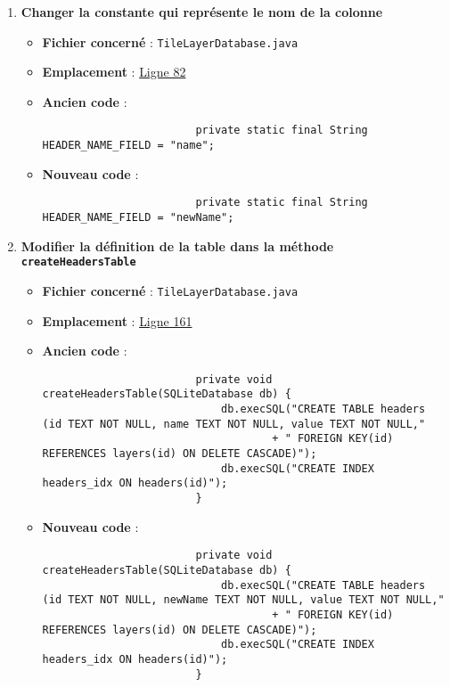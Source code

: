 \begin{enumerate}
    \item \textbf{Changer la constante qui représente le nom de la colonne}
          \begin{itemize}
              \item \textbf{Fichier concerné} : \texttt{TileLayerDatabase.java}
              \item \textbf{Emplacement} : \href{https://github.com/MarcusWolschon/osmeditor4android/blob/dcabe8084aa15f5551a37c990516bf73398af1bf/src/main/java/de/blau/android/resources/TileLayerDatabase.java#L82}{Ligne 82}
              \item \textbf{Ancien code} :
                    \begin{verbatim}
                        private static final String HEADER_NAME_FIELD = "name";
                    \end{verbatim}
              \item \textbf{Nouveau code} :
                    \begin{verbatim}
                        private static final String HEADER_NAME_FIELD = "newName";
                    \end{verbatim}
          \end{itemize}

    \item \textbf{Modifier la définition de la table dans la méthode \texttt{createHeadersTable}}
          \begin{itemize}
              \item \textbf{Fichier concerné} : \texttt{TileLayerDatabase.java}
              \item \textbf{Emplacement} : \href{https://github.com/MarcusWolschon/osmeditor4android/blob/dcabe8084aa15f5551a37c990516bf73398af1bf/src/main/java/de/blau/android/resources/TileLayerDatabase.java#L161}{Ligne 161}
              \item \textbf{Ancien code} :
                    \begin{verbatim}
                        private void createHeadersTable(SQLiteDatabase db) {
                            db.execSQL("CREATE TABLE headers (id TEXT NOT NULL, name TEXT NOT NULL, value TEXT NOT NULL,"
                                    + " FOREIGN KEY(id) REFERENCES layers(id) ON DELETE CASCADE)");
                            db.execSQL("CREATE INDEX headers_idx ON headers(id)");
                        }
                    \end{verbatim}
              \item \textbf{Nouveau code} :
                    \begin{verbatim}
                        private void createHeadersTable(SQLiteDatabase db) {
                            db.execSQL("CREATE TABLE headers (id TEXT NOT NULL, newName TEXT NOT NULL, value TEXT NOT NULL,"
                                    + " FOREIGN KEY(id) REFERENCES layers(id) ON DELETE CASCADE)");
                            db.execSQL("CREATE INDEX headers_idx ON headers(id)");
                        }
                    \end{verbatim}
          \end{itemize}


\end{enumerate}
